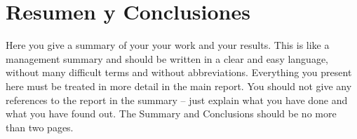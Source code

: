 \section*{Resumen y Conclusiones}

Here you give a summary of your your work and your results. This is like a management summary and should be written in a clear and easy language, without many difficult terms and without abbreviations. Everything you present here must be treated in more detail in the main report. You should not give any references to the report in the summary -- just explain what you have done and what you have found out. The Summary and Conclusions should be no more than two pages.